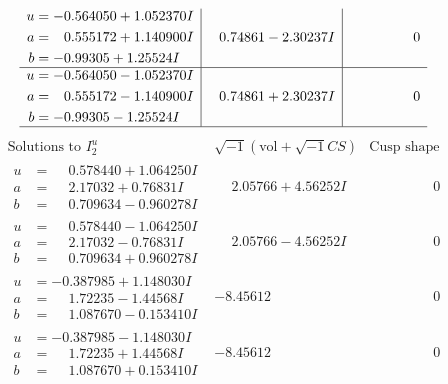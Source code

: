 \documentclass[1p]{elsarticle_modified}
\theoremstyle{definition}
\newcommand{\I}{\sqrt{-1}}
\begin{document}
$$\begin{array}{c|c|c}
\begin{aligned}
u &= -0.564050 + 1.052370 I \\
a &= \phantom{-}0.555172 + 1.140900 I \\
b &= -0.99305 + 1.25524 I\end{aligned}
 & \phantom{-}0.74861 - 2.30237 I & \phantom{-0.000000 } 0 \\ \hline\begin{aligned}
u &= -0.564050 - 1.052370 I \\
a &= \phantom{-}0.555172 - 1.140900 I \\
b &= -0.99305 - 1.25524 I\end{aligned}
 & \phantom{-}0.74861 + 2.30237 I & \phantom{-0.000000 } 0\\
 \hline 
 \end{array}$$\newpage$$\begin{array}{c|c|c}  
\text{Solutions to }I^u_{2}& \I (\text{vol} + \sqrt{-1}CS) & \text{Cusp shape}\\
 \hline 
\begin{aligned}
u &= \phantom{-}0.578440 + 1.064250 I \\
a &= \phantom{-}2.17032 + 0.76831 I \\
b &= \phantom{-}0.709634 - 0.960278 I\end{aligned}
 & \phantom{-}2.05766 + 4.56252 I & \phantom{-0.000000 } 0 \\ \hline\begin{aligned}
u &= \phantom{-}0.578440 - 1.064250 I \\
a &= \phantom{-}2.17032 - 0.76831 I \\
b &= \phantom{-}0.709634 + 0.960278 I\end{aligned}
 & \phantom{-}2.05766 - 4.56252 I & \phantom{-0.000000 } 0 \\ \hline\begin{aligned}
u &= -0.387985 + 1.148030 I \\
a &= \phantom{-}1.72235 - 1.44568 I \\
b &= \phantom{-}1.087670 - 0.153410 I\end{aligned}
 & -8.45612\phantom{ +0.000000I} & \phantom{-0.000000 } 0 \\ \hline\begin{aligned}
u &= -0.387985 - 1.148030 I \\
a &= \phantom{-}1.72235 + 1.44568 I \\
b &= \phantom{-}1.087670 + 0.153410 I\end{aligned}
 & -8.45612\phantom{ +0.000000I} & \phantom{-0.000000 } 0 \\ \hline\begin{aligned}

\end{aligned}
\end{array}$$
\end{document}
